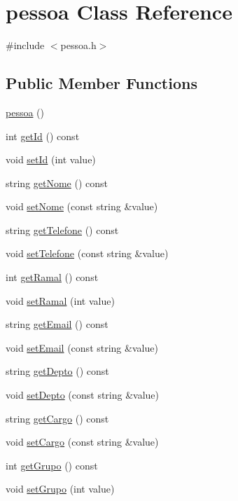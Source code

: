 \hypertarget{classpessoa}{}\section{pessoa Class Reference}
\label{classpessoa}


{\ttfamily \#include $<$pessoa.\+h$>$}

\subsection*{Public Member Functions}
\begin{DoxyCompactItemize}
\item 
\hyperlink{classpessoa_ae2ee70812ff092a18c24ed94eaae260b}{pessoa} ()
\item 
int \hyperlink{classpessoa_a9a20cb67d382a667ad8ed10761b50211}{get\+Id} () const
\item 
void \hyperlink{classpessoa_ab528a41c403719b847f8e43c0893e14c}{set\+Id} (int value)
\item 
string \hyperlink{classpessoa_ad673a812f80d63efaef99aa84096ceb1}{get\+Nome} () const
\item 
void \hyperlink{classpessoa_a5e7a713ac30be9101a9d3d59848269e1}{set\+Nome} (const string \&value)
\item 
string \hyperlink{classpessoa_a248cbdf67320b616ba15c323dea16bb5}{get\+Telefone} () const
\item 
void \hyperlink{classpessoa_ae407991762018bfd08cf3f3d52262071}{set\+Telefone} (const string \&value)
\item 
int \hyperlink{classpessoa_afe3f63c712664c2ac32f89ed8595d75d}{get\+Ramal} () const
\item 
void \hyperlink{classpessoa_a4e6fa1b22e8824e270fd2aee4c9866e7}{set\+Ramal} (int value)
\item 
string \hyperlink{classpessoa_a41fc2c5db3716b88356b23987fd14bb4}{get\+Email} () const
\item 
void \hyperlink{classpessoa_ab5f43c9f7ab0b72df2758d4d1da92a63}{set\+Email} (const string \&value)
\item 
string \hyperlink{classpessoa_a7e0858513abeb0579b987e7a7a79f0d7}{get\+Depto} () const
\item 
void \hyperlink{classpessoa_ae71cc4caf660b5ffc4f9bedc5b4d9d79}{set\+Depto} (const string \&value)
\item 
string \hyperlink{classpessoa_aa4b0643f31c9d0e338ca7a485bc0723d}{get\+Cargo} () const
\item 
void \hyperlink{classpessoa_a9fd52a51b1f987c28aa8016899beb892}{set\+Cargo} (const string \&value)
\item 
int \hyperlink{classpessoa_ad1bad474adbfadf472ad857a7c5f181c}{get\+Grupo} () const
\item 
void \hyperlink{classpessoa_abde4772449869bd2c8e5e6d280e4f9f5}{set\+Grupo} (int value)
\end{DoxyCompactItemize}
